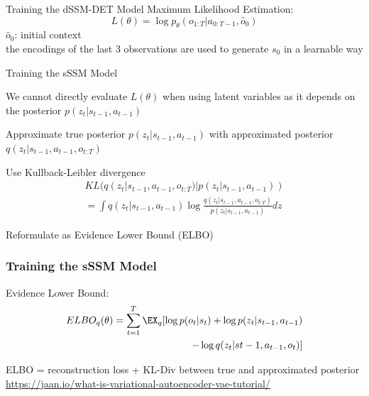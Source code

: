 \begin{frame}{Training the dSSM-DET Model}
    Maximum Likelihood Estimation:
    \begin{equation}
            L(\theta) = \log p_{\theta}(o_{1:T}|a_{0:T-1}, \hat{o}_0)
    \end{equation}
        $\hat{o}_0$: initial context\\
        the encodings of the last 3 observations are used to generate $s_0$ in a learnable way
    
\end{frame}

\begin{frame}{Training the sSSM Model}
		\begin{PraesentationAufzaehlung}
			\item We cannot directly evaluate $L(\theta)$ when using latent variables as it depends on the posterior $p(z_t|s_{t-1},a_{t-1})$
			\item Approximate true posterior $p(z_t|s_{t-1},a_{t-1})$ with approximated posterior $q(z_t|s_{t-1},a_{t-1},o_{t:T})$
			\item Use Kullback-Leibler divergence
			\begin{equation}
			\begin{aligned}
				KL(q(z_t|s_{t-1},a_{t-1},o_{t:T})|p(z_t|s_{t-1},a_{t-1})) \\= \int q(z_t|s_{t-1},a_{t-1}) \log \frac{q(z_t|s_{t-1},a_{t-1},o_{t:T})}{p(z_t|s_{t-1},a_{t-1})}dz
			\end{aligned}			
			\end{equation}
			\item Reformulate as Evidence Lower Bound (ELBO)
		\end{PraesentationAufzaehlung}
\end{frame}

\begin{frame}
	\frametitle{Training the sSSM Model}
		\vspace{-10mm}
        Evidence Lower Bound:
        \begin{equation}
        \begin{aligned}
            ELBO_q(\theta) = \sum_{t=1}^T \EX_q[\log p(o_t|s_t) + \log p(z_t|s_{t-1}, a_{t-1})\\ - \log q(z_t|s{t-1}, a_{t-1}, o_t)]
        \end{aligned}
        \end{equation}
        
        ELBO = reconstruction loss + KL-Div between true and approximated posterior\\
        \vspace{10mm}
        \href{https://jaan.io/what-is-variational-autoencoder-vae-tutorial/}{https://jaan.io/what-is-variational-autoencoder-vae-tutorial/}
\end{frame}

